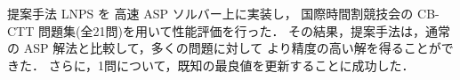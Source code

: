 提案手法 LNPS を 高速 ASP ソルバー{\clingo}上に実装し，
国際時間割競技会の CB-CTT 問題集(全21問)を用いて性能評価を行った．
その結果，提案手法は，通常の ASP 解法と比較して，多くの問題に対して
より精度の高い解を得ることができた．
さらに，1問について，既知の最良値を更新することに成功した．



